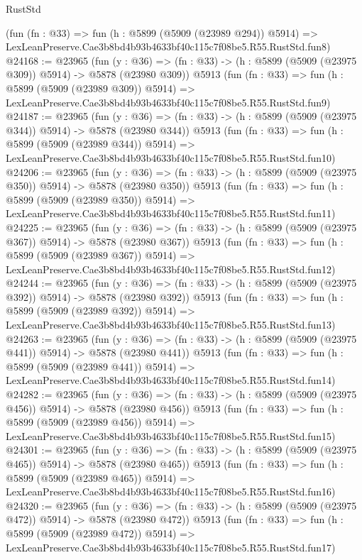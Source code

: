 \begin{lexlean}{RustStd}
\begin{coremodule}
{{    (fun (fn : @33) =>
    fun (h : @5899 (@5909 (@23989 @294)) @5914) =>
    LexLeanPreserve.Cae3b8bd4b93b4633bf40c115c7f08be5.R55.RustStd.fun8)
@24168 := @23965
    (fun (y : @36) => (fn : @33) -> (h : @5899 (@5909 (@23975 @309)) @5914) -> @5878 (@23980 @309))
    @5913
    (fun (fn : @33) =>
    fun (h : @5899 (@5909 (@23989 @309)) @5914) =>
    LexLeanPreserve.Cae3b8bd4b93b4633bf40c115c7f08be5.R55.RustStd.fun9)
@24187 := @23965
    (fun (y : @36) => (fn : @33) -> (h : @5899 (@5909 (@23975 @344)) @5914) -> @5878 (@23980 @344))
    @5913
    (fun (fn : @33) =>
    fun (h : @5899 (@5909 (@23989 @344)) @5914) =>
    LexLeanPreserve.Cae3b8bd4b93b4633bf40c115c7f08be5.R55.RustStd.fun10)
@24206 := @23965
    (fun (y : @36) => (fn : @33) -> (h : @5899 (@5909 (@23975 @350)) @5914) -> @5878 (@23980 @350))
    @5913
    (fun (fn : @33) =>
    fun (h : @5899 (@5909 (@23989 @350)) @5914) =>
    LexLeanPreserve.Cae3b8bd4b93b4633bf40c115c7f08be5.R55.RustStd.fun11)
@24225 := @23965
    (fun (y : @36) => (fn : @33) -> (h : @5899 (@5909 (@23975 @367)) @5914) -> @5878 (@23980 @367))
    @5913
    (fun (fn : @33) =>
    fun (h : @5899 (@5909 (@23989 @367)) @5914) =>
    LexLeanPreserve.Cae3b8bd4b93b4633bf40c115c7f08be5.R55.RustStd.fun12)
@24244 := @23965
    (fun (y : @36) => (fn : @33) -> (h : @5899 (@5909 (@23975 @392)) @5914) -> @5878 (@23980 @392))
    @5913
    (fun (fn : @33) =>
    fun (h : @5899 (@5909 (@23989 @392)) @5914) =>
    LexLeanPreserve.Cae3b8bd4b93b4633bf40c115c7f08be5.R55.RustStd.fun13)
@24263 := @23965
    (fun (y : @36) => (fn : @33) -> (h : @5899 (@5909 (@23975 @441)) @5914) -> @5878 (@23980 @441))
    @5913
    (fun (fn : @33) =>
    fun (h : @5899 (@5909 (@23989 @441)) @5914) =>
    LexLeanPreserve.Cae3b8bd4b93b4633bf40c115c7f08be5.R55.RustStd.fun14)
@24282 := @23965
    (fun (y : @36) => (fn : @33) -> (h : @5899 (@5909 (@23975 @456)) @5914) -> @5878 (@23980 @456))
    @5913
    (fun (fn : @33) =>
    fun (h : @5899 (@5909 (@23989 @456)) @5914) =>
    LexLeanPreserve.Cae3b8bd4b93b4633bf40c115c7f08be5.R55.RustStd.fun15)
@24301 := @23965
    (fun (y : @36) => (fn : @33) -> (h : @5899 (@5909 (@23975 @465)) @5914) -> @5878 (@23980 @465))
    @5913
    (fun (fn : @33) =>
    fun (h : @5899 (@5909 (@23989 @465)) @5914) =>
    LexLeanPreserve.Cae3b8bd4b93b4633bf40c115c7f08be5.R55.RustStd.fun16)
@24320 := @23965
    (fun (y : @36) => (fn : @33) -> (h : @5899 (@5909 (@23975 @472)) @5914) -> @5878 (@23980 @472))
    @5913
    (fun (fn : @33) =>
    fun (h : @5899 (@5909 (@23989 @472)) @5914) =>
    LexLeanPreserve.Cae3b8bd4b93b4633bf40c115c7f08be5.R55.RustStd.fun17)
}}
\end{coremodule}
\end{lexlean}
